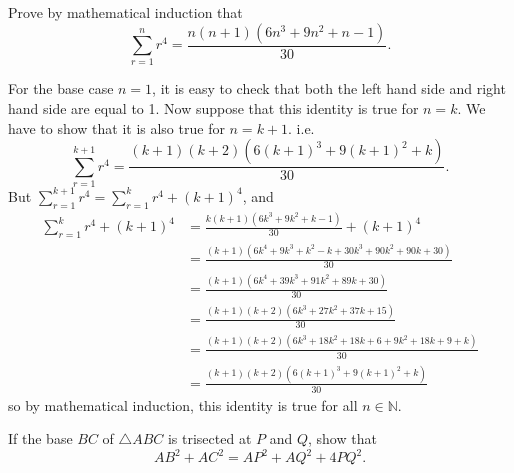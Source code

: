 \begin{question}
    Prove by mathematical induction that 
    \[\sum_{r = 1}^n r^{4} = \frac{n(n + 1)(6n^3 + 9n^2 + n - 1)}{30}.\]
\end{question}
\begin{solution}
    For the base case $n = 1$, it is easy to check that both the left hand side
    and right hand side are equal to 1. Now suppose that this identity is true
    for $n = k$. We have to show that it is also true for $n = k + 1$. i.e.
    \[\sum_{r = 1}^{k + 1}r^4 = \frac{(k + 1)(k + 2)(6(k + 1)^3 + 9(k + 1)^2 +
    k)}{30}.\]
    But $\sum_{r = 1}^{k + 1}r^4 = \sum_{r = 1}^{k} r^4 + (k + 1)^4$, and
    \begin{align*}
        \sum_{r = 1}^{k} r^4 + (k + 1)^4 &= \frac{k(k + 1)(6k^3 + 9k^2 + k - 1)}{30} + (k + 1)^4\\
        &= \frac{(k + 1)(6k^4 + 9k^3 + k^2 - k + 30k^3 + 90k^2 + 90k + 30)}{30}\\
        &= \frac{(k + 1)(6k^4 + 39k^3 + 91k^2 + 89k + 30)}{30}\\
        &= \frac{(k + 1)(k + 2)(6k^3 + 27k^2 + 37k + 15)}{30}\\
        &= \frac{(k + 1)(k + 2)(6k^3 + 18k^2 + 18k + 6 + 9k^2 + 18k + 9 + k)}{30}\\
        &= \frac{(k + 1)(k + 2)(6(k + 1)^3 + 9(k + 1)^2 + k)}{30}
    \end{align*}
    so by mathematical induction, this identity is true for all $n \in
    \mathbb{N}$.
\end{solution}
{}
\label{sol: Sample Problems P10}
\begin{question}
    If the base $BC$ of $\triangle ABC$ is trisected at $P$ and $Q$, show that 
    \[AB^2 + AC^2 = AP^2 + AQ^2 + 4PQ^2.\]
\end{question}
